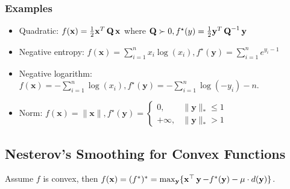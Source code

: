 \subsubsection*{Examples}
\begin{itemize}[leftmargin=*]
    \item Quadratic: $f(\mathbf{x})=\frac{1}{2} \mathbf{x}^{T} \operatorname{\boldsymbol{\mathbf{Q}}} \mathbf{x}$ where $\operatorname{\boldsymbol{\mathbf{Q}}} \succ 0, f^{\star}(y)=\frac{1}{2} \mathbf{y}^{T} \operatorname{\boldsymbol{\mathbf{Q}}}^{-1} \mathbf{y}$
    \item Negative entropy: $f(\mathbf{x})=\sum_{i=1}^{n} x_{i} \log \left(x_{i}\right), f^{\star}(\mathbf{y})=\sum_{i=1}^{n} e^{y_{i}-1}$
    \item Negative logarithm: $f(\mathbf{x})=-\sum_{i=1}^{n} \log \left(x_{i}\right), f^{\star}(\mathbf{y})=-\sum_{i=1}^{n} \log \left(-y_{i}\right)-n$.
    \item Norm: $f(\mathbf{x})=\|\mathbf{x}\|, f^{\star}(\mathbf{y})= \begin{cases}0, & \|\mathbf{y}\|_{*} \leq 1 \\ +\infty, & \|\mathbf{y}\|_{*}>1\end{cases}$
\end{itemize}









\subsection*{Nesterov's Smoothing for Convex Functions}
Assume $f$ is convex, then $f(\operatorname{\boldsymbol{\mathbf{x}}}) = (f^*)^* = \max_{\operatorname{\boldsymbol{\mathbf{y}}}} \{ \operatorname{\boldsymbol{\mathbf{x}}}^\top\operatorname{\boldsymbol{\mathbf{y}}} - f^*(\operatorname{\boldsymbol{\mathbf{y}}}) - \mu\cdot d(\operatorname{\boldsymbol{\mathbf{y}}})\}$.

